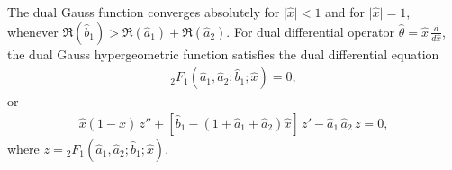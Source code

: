 \documentclass[11pt,a4paper,fleqn]{article}
\numberwithin{equation}{section}
\numberwithin{lemma}{section}
\numberwithin{theorem}{section}
\numberwithin{corollary}{section}
\begin{document}
 The dual Gauss function converges absolutely for $\vert \widehat{x}\vert < 1$ and for $\vert \widehat{x}\vert = 1$, whenever $\Re (\widehat{b}_1) > \Re(\widehat{a}_1) + \Re(\widehat{a}_2)$. For dual differential operator $\widehat{\theta} = \widehat{x} \, \frac{d}{d \widehat{x}}$, the dual Gauss hypergeometric function satisfies the dual differential equation
\begin{align}
[\widehat{\theta} (\widehat{\theta} + \widehat{b}_1 - 1)   - \widehat{x} (\widehat{\theta} + \widehat{a}_1) \, (\widehat{\theta} + \widehat{a}_2) ] {}_2F_1 (\widehat{a}_1, \widehat{a}_2; \widehat{b}_1;  \widehat{x}) = 0,
\end{align}
or
\begin{align}
	\widehat{x} (1 - \widehat{x}) \, z'' + [\widehat{b}_1 - (1 + \widehat{a}_1 + \widehat{a}_2) \widehat{x}] \, z' - \widehat{a}_1 \, \widehat{a}_2 \, z = 0,
\end{align}
where $z = {}_2F_1 (\widehat{a}_1, \widehat{a}_2; \widehat{b}_1;  \widehat{x})$. 
\end{document}

